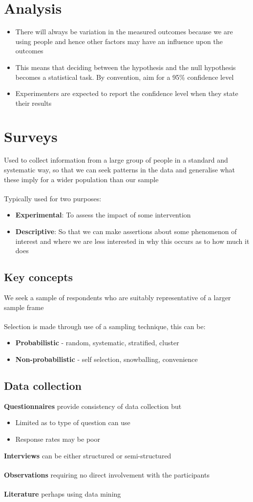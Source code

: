 \documentclass{article}[18pt]
\begin{document}
\section{Analysis}
\begin{itemize}
	\item There will always be variation in the measured outcomes because we are using people and hence other factors may have an influence upon the outcomes
	\item This means that deciding between the hypothesis and the null hypothesis becomes a statistical task. By convention, aim for a 95\% confidence level
	\item Experimenters are expected to report the confidence level when they state their results
\end{itemize}
\section{Surveys}
Used to collect information from a large group of people in a standard and systematic way, so that we can seek patterns in the data and generalise what these imply for a wider population than our sample\\
\\
Typically used for two purposes:
\begin{itemize}
	\item \textbf{Experimental}: To assess the impact of some intervention
	\item \textbf{Descriptive}: So that we can make assertions about some phenomenon of interest and where we are less interested in why this occurs as to how much it does
\end{itemize}
\subsection{Key concepts}
We seek a sample of respondents who are suitably representative of a larger sample frame\\
\\
Selection is made through use of a sampling technique, this can be:
\begin{itemize}
	\item \textbf{Probabilistic} - random, systematic, stratified, cluster
	\item \textbf{Non-probabilistic} - self selection, snowballing, convenience
\end{itemize}
\subsection{Data collection}
\textbf{Questionnaires} provide consistency of data collection but
\begin{itemize}
	\item Limited as to type of question can use
	\item Response rates may be poor
\end{itemize}
\textbf{Interviews} can be either structured or semi-structured\\
\\
\textbf{Observations} requiring no direct involvement with the participants\\
\\
\textbf{Literature} perhaps using data mining
\end{document}
